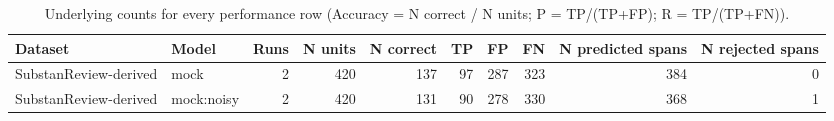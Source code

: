 \begin{table}
\caption{Underlying counts for every performance row (Accuracy = N correct / N units; P = TP/(TP+FP); R = TP/(TP+FN)).}
\label{tab:table_performance_counts}
\begin{tabular}{llrrrrrrrr}
\toprule
Dataset & Model & Runs & N units & N correct & TP & FP & FN & N predicted spans & N rejected spans \\
\midrule
SubstanReview-derived & mock & 2 & 420 & 137 & 97 & 287 & 323 & 384 & 0 \\
SubstanReview-derived & mock:noisy & 2 & 420 & 131 & 90 & 278 & 330 & 368 & 1 \\
\bottomrule
\end{tabular}
\end{table}
